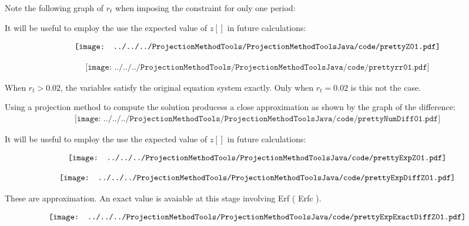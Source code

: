 \documentclass[12pt]{article}
\begin{document}
Note the following graph of $r_t$ when imposing the constraint for only one period:




It will be useful to employ the use the expected value of $z[]$ in future calculations:


\begin{gather*}
  \vcenter{\hbox{\texttt{[image: ../../../ProjectionMethodTools/ProjectionMethodToolsJava/code/prettyZ01.pdf]}}}\\
\end{gather*}




\begin{gather*}
\texttt{[image: ../../../ProjectionMethodTools/ProjectionMethodToolsJava/code/prettyrr01.pdf]}
\end{gather*}

When $r_t>0.02$, the variables satisfy the original equation system exactly.
Only when $r_t=0.02$ is this not the case.

Using a projection method to compute the solution producess a close approximation as shown by the graph of the difference:
\begin{gather*}
\texttt{[image: ../../../ProjectionMethodTools/ProjectionMethodToolsJava/code/prettyNumDiff01.pdf]}
\end{gather*}



It will be useful to employ the use the expected value of $z[]$ in future calculations:


\begin{gather*}
  \vcenter{\hbox{\texttt{[image: ../../../ProjectionMethodTools/ProjectionMethodToolsJava/code/prettyExpZ01.pdf]}}}\\
\end{gather*}

\begin{gather*}
  \vcenter{\hbox{\texttt{[image: ../../../ProjectionMethodTools/ProjectionMethodToolsJava/code/prettyExpDiffZ01.pdf]}}}\\
\end{gather*}

These are approximation. An exact value is avaiable at this stage involving 
Erf ( Erfc ).

\begin{gather*}
  \vcenter{\hbox{\texttt{[image: ../../../ProjectionMethodTools/ProjectionMethodToolsJava/code/prettyExpExactDiffZ01.pdf]}}}\\
\end{gather*}
\end{document}
